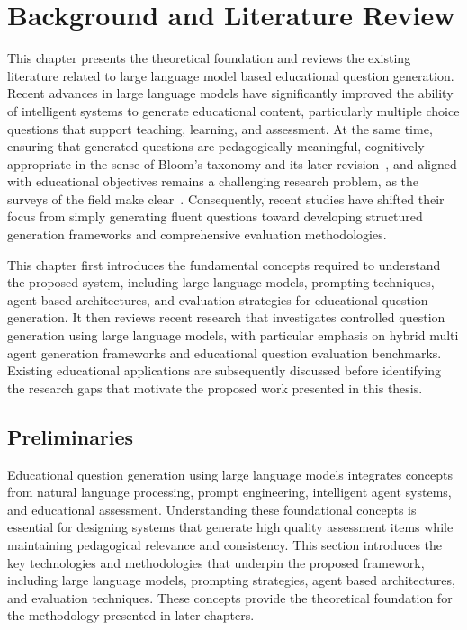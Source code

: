 \chapter{Background and Literature Review}
\label{ch:background}

This chapter presents the theoretical foundation and reviews the existing literature related to large language model based educational question generation. Recent advances in large language models have significantly improved the ability of intelligent systems to generate educational content, particularly multiple choice questions that support teaching, learning, and assessment. At the same time, ensuring that generated questions are pedagogically meaningful, cognitively appropriate in the sense of Bloom's taxonomy and its later revision~\cite{bloom1956taxonomy,anderson2001revised}, and aligned with educational objectives remains a challenging research problem, as the surveys of the field make clear~\cite{kurdi2020systematic}. Consequently, recent studies have shifted their focus from simply generating fluent questions toward developing structured generation frameworks and comprehensive evaluation methodologies.

This chapter first introduces the fundamental concepts required to understand the proposed system, including large language models, prompting techniques, agent based architectures, and evaluation strategies for educational question generation. It then reviews recent research that investigates controlled question generation using large language models, with particular emphasis on hybrid multi agent generation frameworks and educational question evaluation benchmarks. Existing educational applications are subsequently discussed before identifying the research gaps that motivate the proposed work presented in this thesis.
\section{Preliminaries}
\label{sec:back-prelim}

Educational question generation using large language models integrates concepts from natural language processing, prompt engineering, intelligent agent systems, and educational assessment. Understanding these foundational concepts is essential for designing systems that generate high quality assessment items while maintaining pedagogical relevance and consistency. This section introduces the key technologies and methodologies that underpin the proposed framework, including large language models, prompting strategies, agent based architectures, and evaluation techniques. These concepts provide the theoretical foundation for the methodology presented in later chapters.
